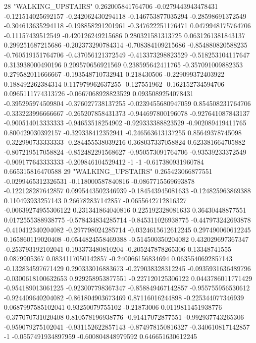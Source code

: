 28 "WALKING_UPSTAIRS" 0.262005841764706 -0.0279443943478431 -0.121514025692157 -0.242062430294118 -0.146753877035294 -0.28598691372549 -0.304613635294118 -0.198858291201961 -0.347622251176471 0.0479948175764706 -0.11157439512549 -0.420126249215686 0.280321581313725 0.0631261381843137 0.299251687215686 -0.202373290784314 -0.708384109215686 -0.854880820588235 -0.760519151764706 -0.437056121372549 -0.413373298823529 -0.518253104117647 0.313938000490196 0.209570656921569 0.238595642411765 -0.357091009882353 0.279582011666667 -0.193548710732941 0.218430506 -0.229099372403922 0.188492262384314 0.117979962637255 -0.127551962 -0.162152734594706 0.0965111774313726 -0.0667068928823529 0.0935089254078431 -0.395295974509804 -0.376027738137255 -0.0239455680947059 0.854508231764706 -0.333223996666667 -0.265207858431373 -0.944697800196078 -0.927641087843137 -0.900514013333333 -0.94653518254902 -0.929333388823529 -0.902089419411765 0.800429030392157 -0.329338412352941 -0.246563613137255 0.85649378745098 -0.322990733333333 -0.284455538039216 0.368037337058824 0.623381664705882 -0.807219517058824 -0.852482291568627 -0.950573091764706 -0.93539233372549 -0.909177643333333 -0.209846104529412 -1 -1 -0.617380931960784 0.665315816470588
29 "WALKING_UPSTAIRS" 0.265423066877551 -0.0299465312326531 -0.118000587840816 -0.0867715569693878 -0.122128287642857 0.0995443502346939 -0.184543945081633 -0.124825963869388 0.110493933257143 0.266782837142857 -0.0655642712816327 -0.00639274955306122 0.231341864040816 0.225192328081633 0.36430448877551 0.0172555388938775 -0.578434834285714 -0.845311026938775 -0.447973242693878 -0.410412340204082 -0.297798024285714 -0.0324615612612245 0.297490060612245 0.165860119020408 -0.0544824558469388 -0.514500350204082 0.432029697367347 -0.253793192102041 0.193373480810204 -0.205247878265306 0.13348741555 0.0879905367 0.0834117050142857 -0.240066156834694 0.0635540692857143 -0.132834597671429 0.290333016883673 -0.279038328312245 -0.0935931636489796 -0.0300618100632653 0.929258953877551 -0.227120125306122 0.0443786011771429 -0.954189013061225 -0.923007798367347 -0.858849467142857 -0.955755956530612 -0.924409640204082 -0.861804903673469 0.87116016244898 -0.225344077346939 0.0687997585102041 0.93250079755102 -0.21873006 0.0119811451938776 -0.377070731020408 0.810578196938776 -0.91417072877551 -0.992937743265306 -0.959079275102041 -0.931152622857143 -0.874978150816327 -0.340610817142857 -1 -0.0557491934897959 -0.600804848979592 0.646651630612245
